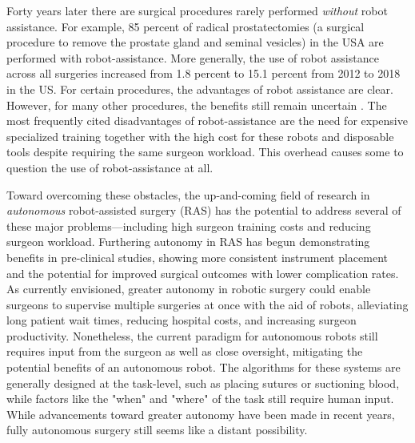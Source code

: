 \documentclass[fleqn,10pt]{wlscirep}\twocolumn
\begin{document}
Forty years later there are surgical procedures rarely performed \textit{without} robot assistance\cite{seo2016comparison}. 
For example, 85 percent of radical prostatectomies (a surgical procedure to remove the prostate gland and seminal vesicles) in the USA are performed with robot-assistance\cite{seo2016comparison}. 
More generally, the use of robot assistance across all surgeries increased from 1.8 percent to 15.1 percent from 2012 to 2018 in the US\cite{sheetz2020trends}. 
For certain procedures, the advantages of robot assistance are clear. 
However, for many other procedures, the benefits still remain uncertain \cite{dhanani2021evidence}. 
The most frequently cited disadvantages of robot-assistance are the need for expensive specialized training together with the high cost for these robots and disposable tools despite requiring the same surgeon workload. 
This overhead causes some to question the use of robot-assistance at all\cite{lotan2012robotic}.

Toward overcoming these obstacles, the up-and-coming field of research in \textit{autonomous} robot-assisted surgery (RAS) has the potential to address several of these major problems---including high surgeon training costs and reducing surgeon workload. 
Furthering autonomy in RAS has begun demonstrating benefits in pre-clinical studies, showing more consistent instrument placement and the potential for improved surgical outcomes with lower complication rates\cite{shademan2016supervised, saeidi2022autonomous, kuntz2023autonomous}. 
As currently envisioned, greater autonomy in robotic surgery could enable surgeons to supervise multiple surgeries at once with the aid of robots, alleviating long patient wait times, reducing hospital costs, and increasing surgeon productivity.
Nonetheless, the current paradigm for autonomous robots still requires input from the surgeon as well as close oversight, mitigating the potential benefits of an autonomous robot.
The algorithms for these systems are generally designed at the task-level, such as placing sutures\cite{saeidi2022autonomous} or suctioning blood\cite{richter2021autonomous}, while factors like the "when" and "where" of the task still require human input. 
While advancements toward greater autonomy have been made in recent years, fully autonomous surgery still seems like a distant possibility. %
\end{document}

